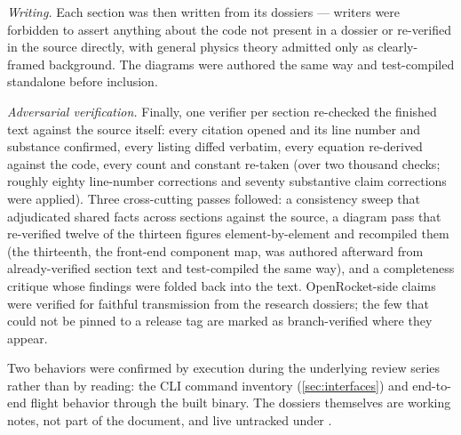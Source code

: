 \emph{Writing.} Each section was then written from its dossiers --- writers were
forbidden to assert anything about the code not present in a dossier or re-verified in
the source directly, with general physics theory admitted only as clearly-framed
background. The diagrams were authored the same way and test-compiled standalone before
inclusion.

\emph{Adversarial verification.} Finally, one verifier per section re-checked the
finished text against the source itself: every citation opened and its line number and
substance confirmed, every listing diffed verbatim, every equation re-derived against
the code, every count and constant re-taken (over two thousand checks; roughly eighty
line-number corrections and seventy substantive claim corrections were applied). Three
cross-cutting passes followed: a consistency sweep that adjudicated shared facts across
sections against the source, a diagram pass that re-verified twelve of the thirteen
figures element-by-element and recompiled them (the thirteenth, the front-end component
map, was authored afterward from already-verified section text and test-compiled the
same way), and a completeness critique whose findings were folded back into the text. OpenRocket-side claims were verified for
faithful transmission from the research dossiers; the few that could not be pinned to a
release tag are marked as branch-verified where they appear.

Two behaviors were confirmed by execution during the underlying review series rather
than by reading: the CLI command inventory (\cref{sec:interfaces}) and end-to-end flight
behavior through the built  binary. The dossiers themselves are
working notes, not part of the document, and live untracked under .
